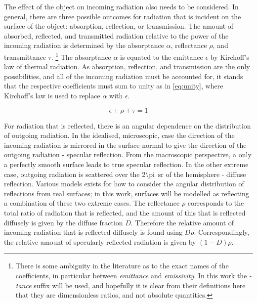 \documentclass[11pt,a4paper]{article}
\begin{document}
The effect of the object on incoming radiation also needs to be considered. In general, there are three possible outcomes for radiation that is incident on the surface of the object: absorption, reflection, or transmission. The amount of absorbed, reflected, and transmitted radiation relative to the power of the incoming radiation is determined by the absorptance $ \alpha $, reflectance $ \rho $, and transmittance $ \tau $.%
\footnote{There is some ambiguity in the literature as to the exact names of the coefficients, in particular between \emph{emittance} and \emph{emissivity}. In this work the \emph{-tance} suffix will be used, and hopefully it is clear from their definitions here that they are dimensionless ratios, and not absolute quantities.} %
The absorptance $ \alpha $ is equated to the emittance $ \epsilon $ by Kirchoff's law of thermal radiation. As absorption, reflection, and transmission are the only possibilities, and all of the incoming radiation must be accounted for, it stands that the respective coefficients must sum to unity as in \cref{eq:unity}, where Kirchoff's law is used to replace $ \alpha $ with $ \epsilon $.

\begin{equation}\label{eq:unity}
	\epsilon + \rho + \tau = 1
\end{equation}

For radiation that is reflected, there is an angular dependence on the distribution of outgoing radiation. In the idealised, microscopic, case the direction of the incoming radiation is mirrored in the surface normal to give the direction of the outgoing radiation - specular reflection. From the macroscopic perspective, a only a perfectly smooth surface leads to true specular reflection. In the other extreme case, outgoing radiation is scattered over the \SI{2\pi}{\steradian} of the hemisphere - diffuse reflection. Various models exists for how to consider the angular distribution of reflections from real surfaces; in this work, surfaces will be modelled as reflecting a combination of these two extreme cases. The reflectance $ \rho $ corresponds to the total ratio of radiation that is reflected, and the amount of this that is reflected diffusely is given by the diffuse fraction $ D $. Therefore the relative amount of  incoming radiation that is reflected diffusely is found using $ D\rho $. Correspondingly, the relative amount of specularly reflected radiation is given by $ \left(1 - D\right)\rho $.
\end{document}
